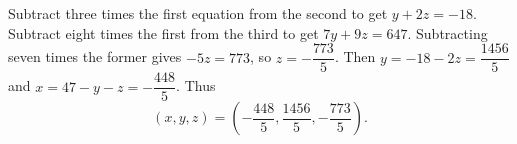 Subtract three times the first equation from the second to get $y+2z=-18$. Subtract eight times the first from the third to get $7y+9z=647$. Subtracting seven times the former gives $-5z=773$, so $z=-\dfrac{773}{5}$. Then $y=-18-2z=\dfrac{1456}{5}$ and $x=47-y-z=-\dfrac{448}{5}$. Thus
\[\boxed{(x,y,z)=\left(-\dfrac{448}{5},\dfrac{1456}{5},-\dfrac{773}{5}\right)}.\]
